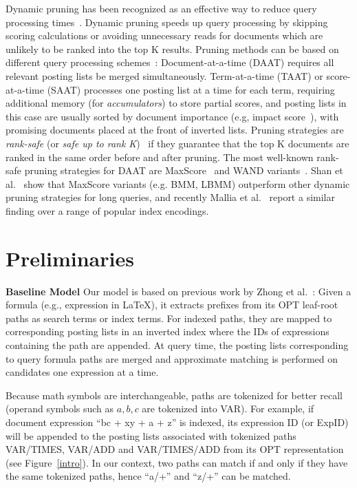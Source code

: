 \documentclass[runningheads]{llncs}
\begin{document}
Dynamic pruning has been recognized as an effective way to reduce query processing times~\cite{jonassen_simon_2011, antonio2019, Shandongdong2012, macdonald2011upper, tonellotto2018efficient}.
%
Dynamic pruning speeds up query processing by skipping scoring calculations or avoiding unnecessary reads for documents which are unlikely to be ranked into the top K results.
%
Pruning methods can be based on different query processing schemes~\cite{Shandongdong2012}:
Document-at-a-time (DAAT) requires all relevant posting lists be merged simultaneously. Term-at-a-time (TAAT) or score-at-a-time (SAAT) processes one posting list at a time for each term, requiring additional memory (for \textit{accumulators}) to store partial scores, and posting lists in this case are usually sorted by document importance (e.g, impact score~\cite{anh2006SAAT}), with promising documents placed at  the front of inverted lists.
%
Pruning strategies are \textit{rank-safe} (or \textit{safe up to rank K})~\cite{turtle_flood_1995} if they guarantee that the top K documents are ranked in the same order before and after pruning. 
%
The most well-known rank-safe pruning strategies for DAAT are MaxScore~\cite{turtle_flood_1995, strohman_turtle_2005, jonassen_simon_2011} and WAND variants~\cite{broder2003WAND, ding2011BMW}.
%
Shan et al.~\cite{Shandongdong2012} show that MaxScore variants (e.g. BMM, LBMM) outperform other dynamic pruning strategies for long queries, and recently Mallia et al.~\cite{antonio2019} report a similar finding over a range of popular index encodings.


\section{Preliminaries}
\noindent\textbf{Baseline Model}\; Our model is based on previous work by Zhong et al.~\cite{a0_2019}: Given a formula (e.g., expression in \LaTeX{}), it extracts prefixes from its OPT leaf-root paths as search terms or index terms. For indexed paths, they are mapped to corresponding posting lists in an inverted index where the IDs of expressions containing the path are appended.
At query time, the posting lists corresponding to query formula paths are merged and approximate matching is performed on candidates one expression at a time.

Because math symbols are interchangeable, paths are tokenized for better recall (operand symbols such as $a, b, c$ are tokenized into VAR).
For example, if document expression ``bc + xy + a + z'' is indexed, its expression ID (or ExpID) will be appended to the posting lists associated with tokenized paths VAR/TIMES, VAR/ADD and VAR/TIMES/ADD from its OPT representation (see Figure~\ref{intro}).
%
In our context, two paths can match if and only if they have the same tokenized paths,
hence ``a/+'' and ``z/+'' can be matched.
\end{document}
